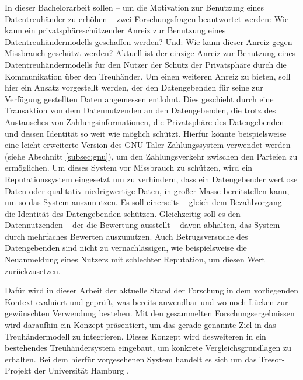 \documentclass[
	fontsize=12pt,
	headings=small,
	parskip=half,           %
	bibliography=totoc,
	numbers=noenddot,       %
	open=any,               %
]{scrreprt}
\begin{document}
In dieser Bachelorarbeit sollen -- um die Motivation zur Benutzung eines Datentreuhänder zu erhöhen -- zwei Forschungsfragen beantwortet werden: Wie kann ein privatsphäreschützender Anreiz zur Benutzung eines Datentreuhändermodells geschaffen werden? Und: Wie kann dieser Anreiz gegen Missbrauch geschützt werden? Aktuell ist der einzige Anreiz zur Benutzung eines Datentreuhändermodells für den Nutzer der Schutz der Privatsphäre durch die Kommunikation über den Treuhänder. Um einen weiteren Anreiz zu bieten, soll hier ein Ansatz vorgestellt werden, der den Datengebenden für seine zur Verfügung gestellten Daten angemessen entlohnt. Dies geschieht durch eine Transaktion von dem Datennutzenden an den Datengebenden, die trotz des Austausches von Zahlungsinformationen, die Privatsphäre des Datengebenden und dessen Identität so weit wie möglich schützt. Hierfür könnte beispielsweise eine leicht erweiterte Version des GNU Taler Zahlungssystem verwendet werden (siehe Abschnitt \ref{subsec:gnu}), um den Zahlungsverkehr zwischen den Parteien zu ermöglichen. Um dieses System vor Missbrauch zu schützen, wird ein Reputationssystem eingesetzt um zu verhindern, dass ein Datengebender wertlose Daten oder qualitativ niedrigwertige Daten, in großer Masse bereitstellen kann, um so das System auszunutzen. Es soll einerseits -- gleich dem Bezahlvorgang -- die Identität des Datengebenden schützen. Gleichzeitig soll es den Datennutzenden -- der die Bewertung ausstellt -- davon abhalten, das System durch mehrfaches Bewerten auszunutzen. Auch Betrugsversuche des Datengebenden sind nicht zu vernachlässigen, wie beispielsweise die Neuanmeldung eines Nutzers mit schlechter Reputation, um diesen Wert zurückzusetzen.

Dafür wird in dieser Arbeit der aktuelle Stand der Forschung in dem vorliegenden Kontext evaluiert und geprüft, was bereits anwendbar und wo noch Lücken zur gewünschten Verwendung bestehen. Mit den gesammelten Forschungsergebnissen wird daraufhin ein Konzept präsentiert, um das gerade genannte Ziel in das Treuhändermodell zu integrieren. Dieses Konzept wird desweiteren in ein bestehendes Treuhändersystem eingebaut, um konkrete Vergleichsgrundlagen zu erhalten. Bei dem hierfür vorgesehenen System handelt es sich um das Tresor-Projekt der Universität Hamburg \cite{TRESOR}.


\end{document}
